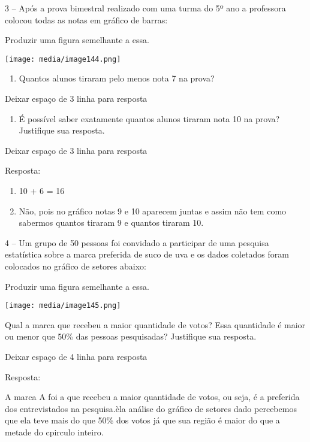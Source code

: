 3 -- Após a prova bimestral realizado com uma turma do 5º ano a
professora colocou todas as notas em gráfico de barras:

Produzir uma figura semelhante a essa.

\texttt{[image: media/image144.png]}

\begin{enumerate}
\def\labelenumi{\alph{enumi})}
\item
  Quantos alunos tiraram pelo menos nota 7 na prova?
\end{enumerate}

Deixar espaço de 3 linha para resposta

\begin{enumerate}
\def\labelenumi{\alph{enumi})}
\item
  É possível saber exatamente quantos alunos tiraram nota 10 na prova?
  Justifique sua resposta.
\end{enumerate}

Deixar espaço de 3 linha para resposta

Resposta:

\begin{enumerate}
\def\labelenumi{\alph{enumi})}
\item
  10 + 6 = 16
\item
  Não, pois no gráfico notas 9 e 10 aparecem juntas e assim não tem como
  sabermos quantos tiraram 9 e quantos tiraram 10.
\end{enumerate}

4 -- Um grupo de 50 pessoas foi convidado a participar de uma pesquisa
estatística sobre a marca preferida de suco de uva e os dados coletados
foram colocados no gráfico de setores abaixo:

Produzir uma figura semelhante a essa.

\texttt{[image: media/image145.png]}

Qual a marca que recebeu a maior quantidade de votos? Essa quantidade é
maior ou menor que 50\% das pessoas pesquisadas? Justifique sua
resposta.

Deixar espaço de 4 linha para resposta

Resposta:

A marca A foi a que recebeu a maior quantidade de votos, ou seja, é a
preferida dos entrevistados na pesquisa.èla análise do gráfico de
setores dado percebemos que ela teve mais do que 50\% dos votos já que
sua região é maior do que a metade do cpirculo inteiro.

